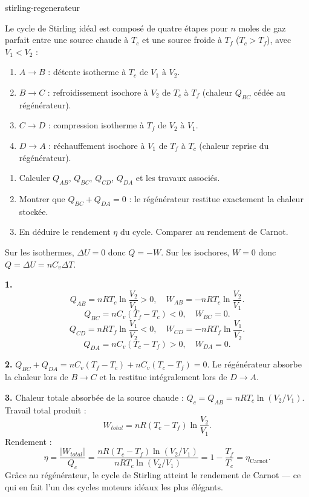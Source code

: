 \begin{exo}{stirling-regenerateur}

Le cycle de Stirling idéal est composé de quatre étapes pour $n$ moles de gaz parfait entre une source chaude à $T_c$ et une source froide à $T_f$ ($T_c > T_f$), avec $V_1 < V_2$ :
\begin{enumerate}[label=\arabic*.]
  \item $A\to B$ : détente isotherme à $T_c$ de $V_1$ à $V_2$.
  \item $B\to C$ : refroidissement isochore à $V_2$ de $T_c$ à $T_f$ (chaleur $Q_{BC}$ cédée au régénérateur).
  \item $C\to D$ : compression isotherme à $T_f$ de $V_2$ à $V_1$.
  \item $D\to A$ : réchauffement isochore à $V_1$ de $T_f$ à $T_c$ (chaleur reprise du régénérateur).
\end{enumerate}

\begin{enumerate}
  \item Calculer $Q_{AB}$, $Q_{BC}$, $Q_{CD}$, $Q_{DA}$ et les travaux associés.
  \item Montrer que $Q_{BC} + Q_{DA} = 0$ : le régénérateur restitue exactement la chaleur stockée.
  \item En déduire le rendement $\eta$ du cycle. Comparer au rendement de Carnot.
\end{enumerate}

\begin{indication}
Sur les isothermes, $\Delta U = 0$ donc $Q = -W$. Sur les isochores, $W = 0$ donc $Q = \Delta U = nC_v\Delta T$.
\end{indication}

\begin{solution}
\textbf{1.}
$$Q_{AB} = nRT_c\ln\frac{V_2}{V_1} > 0, \quad W_{AB} = -nRT_c\ln\frac{V_2}{V_1}.$$
$$Q_{BC} = nC_v(T_f - T_c) < 0, \quad W_{BC} = 0.$$
$$Q_{CD} = nRT_f\ln\frac{V_1}{V_2} < 0, \quad W_{CD} = -nRT_f\ln\frac{V_1}{V_2}.$$
$$Q_{DA} = nC_v(T_c - T_f) > 0, \quad W_{DA} = 0.$$

\textbf{2.} $Q_{BC} + Q_{DA} = nC_v(T_f - T_c) + nC_v(T_c - T_f) = 0$. Le régénérateur absorbe la chaleur lors de $B\to C$ et la restitue intégralement lors de $D\to A$.

\textbf{3.} Chaleur totale absorbée de la source chaude : $Q_c = Q_{AB} = nRT_c\ln(V_2/V_1)$.
Travail total produit :
$$W_{total} = nR(T_c - T_f)\ln\frac{V_2}{V_1}.$$
Rendement :
$$\eta = \frac{|W_{total}|}{Q_c} = \frac{nR(T_c-T_f)\ln(V_2/V_1)}{nRT_c\ln(V_2/V_1)} = 1 - \frac{T_f}{T_c} = \eta_{\text{Carnot}}.$$
Grâce au régénérateur, le cycle de Stirling atteint le rendement de Carnot — ce qui en fait l'un des cycles moteurs idéaux les plus élégants.
\end{solution}

\end{exo}

